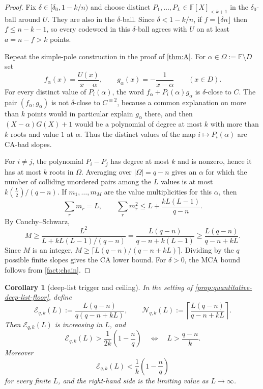 \documentclass[11pt]{article}
\newtheorem{corollary}[corollary]{Corollary}
\theoremstyle{definition}
\theoremstyle{remark}
\newcommand{\F}{\mathbb{F}}
\begin{document}
\begin{proof}
Fix $\delta\in[\delta_0,1-k/n)$ and choose distinct
$P_1,\ldots,P_L\in\F[X]_{<k+1}$ in the $\delta_0$-ball around $U$.
They are also in the $\delta$-ball.  Since $\delta<1-k/n$, if
$f=\lfloor\delta n\rfloor$ then $f\le n-k-1$, so every codeword in this
$\delta$-ball agrees with $U$ on at least $a=n-f>k$ points.

Repeat the simple-pole construction in the proof of \cref{thm:A}.  For
$\alpha\in\Omega:=\F\setminus D$ set
\[
        f_\alpha(x)=\frac{U(x)}{x-\alpha},
        \qquad
        g_\alpha(x)=-\frac1{x-\alpha}
        \qquad (x\in D).
\]
For every distinct value of $P_i(\alpha)$, the word
$f_\alpha+P_i(\alpha)g_\alpha$ is $\delta$-close to $C$.  The pair
$(f_\alpha,g_\alpha)$ is not $\delta$-close to $C^{\equiv2}$, because a
common explanation on more than $k$ points would in particular explain
$g_\alpha$ there, and then $(X-\alpha)G(X)+1$ would be a polynomial of degree at most $k$ with more than $k$ roots and value $1$ at $\alpha$.
Thus the distinct values of the map $i\mapsto P_i(\alpha)$ are CA-bad
slopes.

For $i\ne j$, the polynomial $P_i-P_j$ has degree at most $k$ and is
nonzero, hence it has at most $k$ roots in $\Omega$.  Averaging over
$|\Omega|=q-n$ gives an $\alpha$ for which the number of colliding
unordered pairs among the $L$ values is at most $k\binom L2/(q-n)$.  If
$m_1,\ldots,m_M$ are the value multiplicities for this $\alpha$, then
\[
        \sum_r m_r=L,
        \qquad
        \sum_r m_r^2
        \le L+\frac{kL(L-1)}{q-n}.
\]
By Cauchy--Schwarz,
\[
        M\ge
        \frac{L^2}{L+kL(L-1)/(q-n)}
        =
        \frac{L(q-n)}{q-n+k(L-1)}
        \ge
        \frac{L(q-n)}{q-n+kL}.
\]
Since $M$ is an integer, $M\ge\lceil L(q-n)/(q-n+kL)\rceil$.  Dividing
by the $q$ possible finite slopes gives the CA lower bound.  For $\delta>0$, the MCA
bound follows from \cref{fact:chain}.
\end{proof}

\begin{corollary}[deep-list trigger and ceiling]
\label{cor:deep-list-trigger-ceiling}
In the setting of \cref{prop:quantitative-deep-list-floor}, define
\[
        \mathcal E_{q,k}(L)
        :=\frac{L(q-n)}{q(q-n+kL)},
        \qquad
        \mathcal N_{q,k}(L)
        :=\left\lceil\frac{L(q-n)}{q-n+kL}\right\rceil .
\]
Then $\mathcal E_{q,k}(L)$ is increasing in $L$, and
\[
        \mathcal E_{q,k}(L)>
        \frac1{2k}\left(1-\frac nq\right)
        \quad\Longleftrightarrow\quad
        L>\frac{q-n}{k}.
\]
Moreover
\[
        \mathcal E_{q,k}(L)<\frac1k\left(1-\frac nq\right)
\]
for every finite $L$, and the right-hand side is the limiting value as
$L\to\infty$.
\end{corollary}
\end{document}
